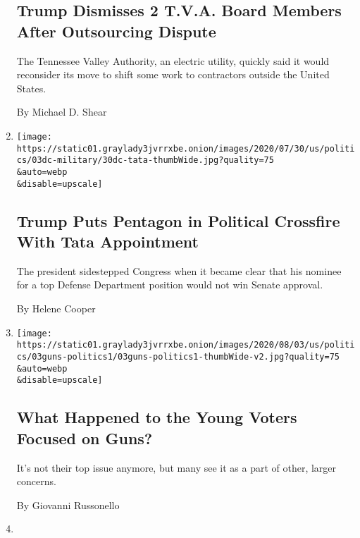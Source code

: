 \begin{enumerate}
  \hypertarget{trump-dismisses-2-tva-board-members-after-outsourcing-dispute}{%
  \subsection{Trump Dismisses 2 T.V.A. Board Members After Outsourcing
  Dispute}\label{trump-dismisses-2-tva-board-members-after-outsourcing-dispute}}

  The Tennessee Valley Authority, an electric utility, quickly said it
  would reconsider its move to shift some work to contractors outside
  the United States.

  By Michael D. Shear
\item
  \href{/2020/08/03/us/politics/tata-pentagon.html}{}

  \texttt{[image: https://static01.graylady3jvrrxbe.onion/images/2020/07/30/us/politics/03dc-military/30dc-tata-thumbWide.jpg?quality=75\\\&auto=webp\\\&disable=upscale]}

  \hypertarget{trump-puts-pentagon-in-political-crossfire-with-tata-appointment}{%
  \subsection{Trump Puts Pentagon in Political Crossfire With Tata
  Appointment}\label{trump-puts-pentagon-in-political-crossfire-with-tata-appointment}}

  The president sidestepped Congress when it became clear that his
  nominee for a top Defense Department position would not win Senate
  approval.

  By Helene Cooper
\item
  \href{/2020/08/03/us/politics/gun-control-voters.html}{}

  \texttt{[image: https://static01.graylady3jvrrxbe.onion/images/2020/08/03/us/politics/03guns-politics1/03guns-politics1-thumbWide-v2.jpg?quality=75\\\&auto=webp\\\&disable=upscale]}

  \hypertarget{what-happened-to-the-young-voters-focused-on-guns}{%
  \subsection{What Happened to the Young Voters Focused on
  Guns?}\label{what-happened-to-the-young-voters-focused-on-guns}}

  It's not their top issue anymore, but many see it as a part of other,
  larger concerns.

  By Giovanni Russonello
\item
  \href{/2020/08/03/us/politics/kris-kobach-kansas-senate-primary.html}{}


\end{enumerate}
